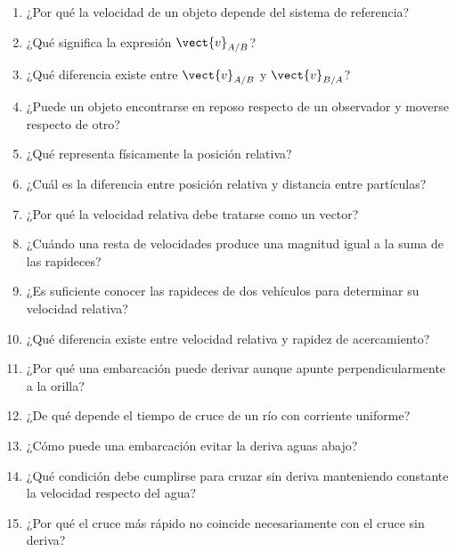 \begin{enumerate}

    \item ¿Por qué la velocidad de un objeto
    depende del sistema de referencia?

    \item ¿Qué significa la expresión
    \(\vect{v}_{A/B}\)?

    \item ¿Qué diferencia existe entre
    \(\vect{v}_{A/B}\) y \(\vect{v}_{B/A}\)?

    \item ¿Puede un objeto encontrarse en reposo
    respecto de un observador y moverse
    respecto de otro?

    \item ¿Qué representa físicamente
    la posición relativa?

    \item ¿Cuál es la diferencia entre
    posición relativa y distancia entre partículas?

    \item ¿Por qué la velocidad relativa
    debe tratarse como un vector?

    \item ¿Cuándo una resta de velocidades
    produce una magnitud igual a la suma
    de las rapideces?

    \item ¿Es suficiente conocer las rapideces
    de dos vehículos para determinar
    su velocidad relativa?

    \item ¿Qué diferencia existe entre
    velocidad relativa y rapidez de acercamiento?

    \item ¿Por qué una embarcación puede
    derivar aunque apunte perpendicularmente
    a la orilla?

    \item ¿De qué depende el tiempo de cruce
    de un río con corriente uniforme?

    \item ¿Cómo puede una embarcación evitar
    la deriva aguas abajo?

    \item ¿Qué condición debe cumplirse
    para cruzar sin deriva manteniendo
    constante la velocidad respecto del agua?

    \item ¿Por qué el cruce más rápido
    no coincide necesariamente con
    el cruce sin deriva?


\end{enumerate}
